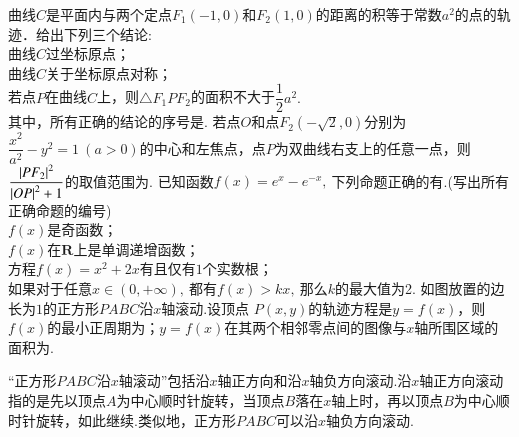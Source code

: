 \documentclass{BHCexam}
\begin{document}
\begin{questions}
\qs 曲线$C$是平面内与两个定点$ F_1(-1,0) $和$F_2(1,0)$的距离的积等于常数$ a^2 $的点的轨迹．给出下列三个结论:\\
 曲线$ C $过坐标原点；\\
 曲线$ C $关于坐标原点对称；\\
 若点$ P $在曲线$ C $上，则$ \triangle F_1PF_2 $的面积不大于$ \dfrac{1}{2}a^2. $\\
其中，所有正确的结论的序号是\tk.
\qs 若点$O$和点$F_2(-\sqrt{2},0) $分别为$\dfrac{x^2}{a^2}-y^2=1~(a>0)$的中心和左焦点，点$ P $为双曲线右支上的任意一点，则$ \dfrac{\left|PF_2\right|^2}{\left|OP\right|^2+1} $的取值范围为\tk.
\qs 已知函数$ f(x)=e^x-e^{-x} ,~$下列命题正确的有\tk.(写出所有正确命题的编号)\\
$f(x)$是奇函数；\\
$f(x)$在$ \mathbf{R} $上是单调递增函数；\\
方程$ f(x)=x^2+2x $有且仅有$ 1 $个实数根；\\
如果对于任意$ x\in (0,+\infty),~ $都有$ f(x)>kx,~ $那么$ k $的最大值为2.
\qs 如图放置的边长为$1$的正方形$PABC$沿$x$轴滚动.设顶点
$P(x,y)$的轨迹方程是$ y=f(x) $，则$f(x)$的最小正周期为\tk；$y=f(x)$在其两个相邻零点间的图像与$x$轴所围区域的面积为\tk.\par
\vspace{-1em}
\begin{center}
\end{center}
\vspace{-1em}
{“正方形$PABC$沿$x$轴滚动”包括沿$x$轴正方向和沿$x$轴负方向滚动.沿$x$轴正方向滚动指的是先以顶点$A$为中心顺时针旋转，当顶点$B$落在$x$轴上时，再以顶点$B$为中心顺时针旋转，如此继续.类似地，正方形$PABC$可以沿$x$轴负方向滚动.}


\end{questions}
\end{document}
